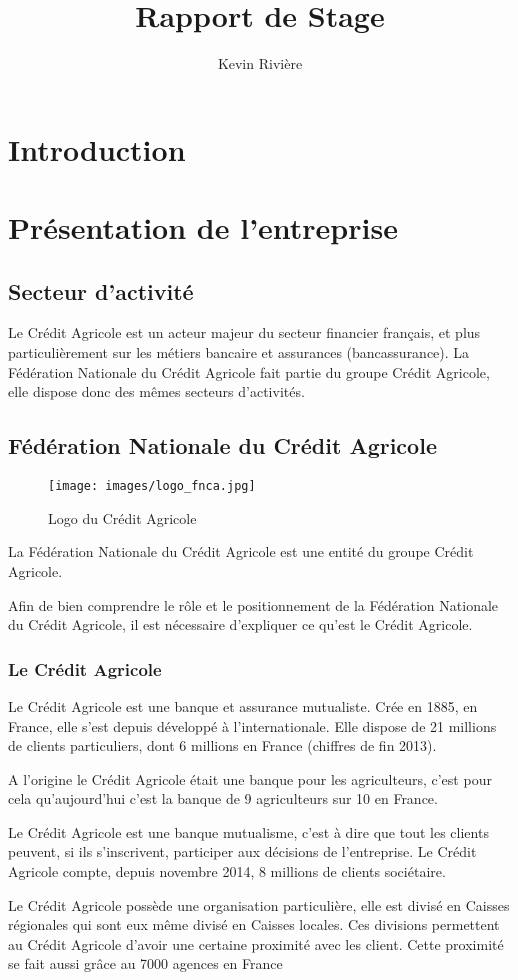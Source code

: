 \documentclass[12pt,a4paper]{article}
\author{Kevin Rivière}
\title{Rapport de Stage}
\begin{document}
\maketitle
\thispagestyle{empty}
\setcounter{page}{0}
\newpage

\tableofcontents
\thispagestyle{empty}
\setcounter{page}{0}
\newpage

\section{Introduction}
\newpage

\section{Présentation de l'entreprise}
\subsection{Secteur d'activité}
Le Crédit Agricole est un acteur majeur du secteur financier français, et plus particulièrement sur les métiers bancaire et assurances (bancassurance).
La Fédération Nationale du Crédit Agricole fait partie du groupe Crédit Agricole, elle dispose donc des mêmes secteurs d'activités.\par
\subsection{Fédération Nationale du Crédit Agricole}
\begin{figure}[h!]
\centering
\texttt{[image: images/logo\_fnca.jpg]}
\caption{Logo du Crédit Agricole}
\end{figure}
La Fédération Nationale du Crédit Agricole est une entité du groupe Crédit Agricole.\par
Afin de bien comprendre le rôle et le positionnement de la Fédération Nationale du Crédit Agricole, il est nécessaire d'expliquer ce qu'est le Crédit Agricole.
\subsubsection{Le Crédit Agricole}
Le Crédit Agricole est une banque et assurance mutualiste. Crée en 1885, en France, elle s'est depuis développé à l'internationale. Elle dispose de 21 millions de clients particuliers, dont 6 millions en France (chiffres de fin 2013).\par
A l'origine le Crédit Agricole était une banque pour les agriculteurs, c'est pour cela qu'aujourd'hui c'est la banque de 9 agriculteurs sur 10 en France.\par
Le Crédit Agricole est une banque mutualisme, c'est à dire que tout les clients peuvent, si ils s'inscrivent, participer aux décisions de l'entreprise. Le Crédit Agricole compte, depuis novembre 2014, 8 millions de clients sociétaire.\par 
Le Crédit Agricole possède une organisation particulière, elle est divisé en Caisses régionales qui sont eux même divisé en Caisses locales. Ces divisions permettent au Crédit Agricole d'avoir une certaine proximité avec les client. Cette proximité se fait aussi grâce au 7000 agences en France\par 
\end{document}
